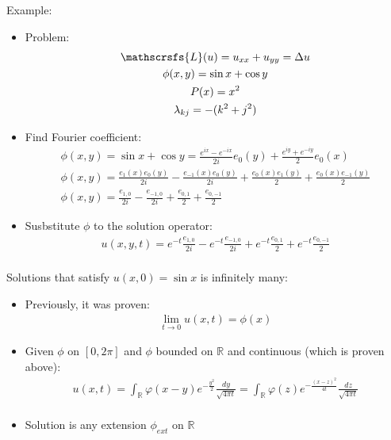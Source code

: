 \documentclass[12pt, a4paper]{article}
\begin{document}
Example:
\begin{itemize}
    \item Problem:
    \begin{gather*}
        \mathscrsfs{L}(u)= u_{xx} + u_{yy} = \Delta u\\
        \phi(x, y) = \sin x + \cos y\\
        P(x) = x^2\\
        \lambda_{kj} = -(k^2+j^2)\\
    \end{gather*}
    \item Find Fourier coefficient:
    \begin{gather*}
        \phi(x, y) = \sin x + \cos y = \frac{e^{ix} - e^{-ix}}{2i} e_0(y) + \frac{e^{iy} + e^{-iy}}{2} e_0(x)\\
        \phi(x, y) = \frac{e_1(x)e_0(y)}{2i} - \frac{e_{-1}(x)e_0(y)}{2i} + \frac{e_0(x)e_1(y)}{2} + \frac{e_0(x)e_{-1}(y)}{2}\\
        \phi(x, y) = \frac{e_{1, 0}}{2i} - \frac{e_{-1, 0}}{2i} + \frac{e_{0, 1}}{2} + \frac{e_{0, -1}}{2}
    \end{gather*}
    \item Susbstitute $\phi$ to the solution operator:
    \begin{gather*}
        u(x, y, t) = e^{-t}\frac{e_{1, 0}}{2i} - e^{-t}\frac{e_{-1, 0}}{2i} + e^{-t}\frac{e_{0, 1}}{2} + e^{-t}\frac{e_{0, -1}}{2}\\
    \end{gather*}
\end{itemize}
Solutions that satisfy $u(x, 0)=\sin x$ is infinitely many:
\begin{itemize}
    \item Previously, it was proven:
    \begin{gather*}
        \lim_{t \to 0} u(x, t) = \phi(x)
    \end{gather*}
    \item Given $\phi$ on $[0, 2\pi]$ and $\phi$ bounded on $\mathbb{R}$ and continuous (which is proven above):
    \begin{gather*}
        u(x, t) = \int_{\mathbb{R}} \varphi(x-y)e^{-\frac{y^2}{2}}\frac{dy}{\sqrt{4\pi t}} = \int_{\mathbb{R}} \varphi(z)e^{-\frac{(x-z)^2}{4t}}\frac{dz}{\sqrt{4\pi t}}\\
    \end{gather*}
    \item Solution is any extension $\phi_{ext}$ on $\mathbb{R}$\\
\end{itemize}
\end{document}
